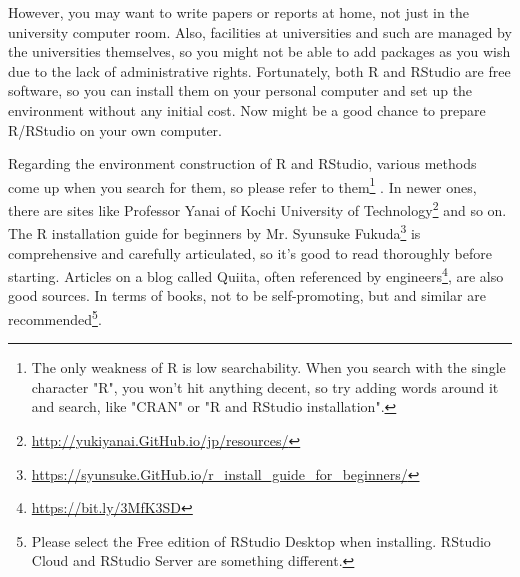 \documentclass{ltjsbook}
\begin{document}
However, you may want to write papers or reports at home, not just in the university computer room. Also, facilities at universities and such are managed by the universities themselves, so you might not be able to add packages as you wish due to the lack of administrative rights. Fortunately, both R and RStudio are free software, so you can install them on your personal computer and set up the environment without any initial cost. Now might be a good chance to prepare R/RStudio on your own computer.

Regarding the environment construction of R and RStudio, various methods come up when you search for them, so please refer to them\footnote {The only weakness of R is low searchability. When you search with the single character "R", you won't hit anything decent, so try adding words around it and search, like "CRAN" or "R and RStudio installation".} . In newer ones, there are sites like Professor Yanai of Kochi University of Technology\footnote{\url{http://yukiyanai.GitHub.io/jp/resources/}} and so on.
The R installation guide for beginners by Mr. Syunsuke Fukuda\footnote{\url{https://syunsuke.GitHub.io/r_install_guide_for_beginners/}} is comprehensive and carefully articulated, so it's good to read thoroughly before starting. Articles on a blog called Quiita, often referenced by engineers\footnote{\url{https://bit.ly/3MfK3SD}}, are also good sources. In terms of books, not to be self-promoting, but \textcite{kosugi2019} and similar are recommended\footnote{Please select the Free edition of RStudio Desktop when installing. RStudio Cloud and RStudio Server are something different.}.
\end{document}
